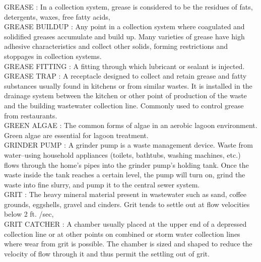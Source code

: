\vspace{0.15cm}
GREASE :  In a collection system, grease is considered to be the residues of fats, detergents, waxes, free fatty acids, \\
\vspace{0.15cm}
GREASE BUILDUP :  Any point in a collection system where coagulated and solidified greases accumulate and build up. Many varieties of grease have high adhesive characteristics and collect other solids, forming restrictions and stoppages in collection systems. \\
\vspace{0.15cm}
GREASE FITTING :   A fitting through which lubricant or sealant is injected.\\
\vspace{0.15cm}
GREASE TRAP :  A receptacle designed to collect and retain grease and fatty substances usually found in kitchens or from similar wastes. It is installed in the drainage system between the kitchen or other point of production of the waste and the building wastewater collection line. Commonly used to control grease from restaurants. \\
\vspace{0.15cm}
GREEN ALGAE :  The common forms of algae in an aerobic lagoon environment. Green algae are essential for lagoon treatment.\\
\vspace{0.15cm}
GRINDER PUMP :   A grinder pump is a waste management device. Waste from water–using household appliances (toilets, bathtubs, washing machines, etc.) flows through the home’s pipes into the grinder pump’s holding tank. Once the waste inside the tank reaches a certain level, the pump will turn on, grind the waste into fine slurry, and pump it to the central sewer system.\\
\vspace{0.15cm}
GRIT :  The heavy mineral material present in wastewater such as sand, coffee grounds, eggshells, gravel and cinders. Grit tends to settle out at flow velocities below 2 ft. /sec, \\
\vspace{0.15cm}
GRIT CATCHER :  A chamber usually placed at the upper end of a depressed collection line or at other points on combined or storm water collection lines where wear from grit is possible. The chamber is sized and shaped to reduce the velocity of flow through it and thus permit the settling out of grit. \\
\vspace{0.15cm}
